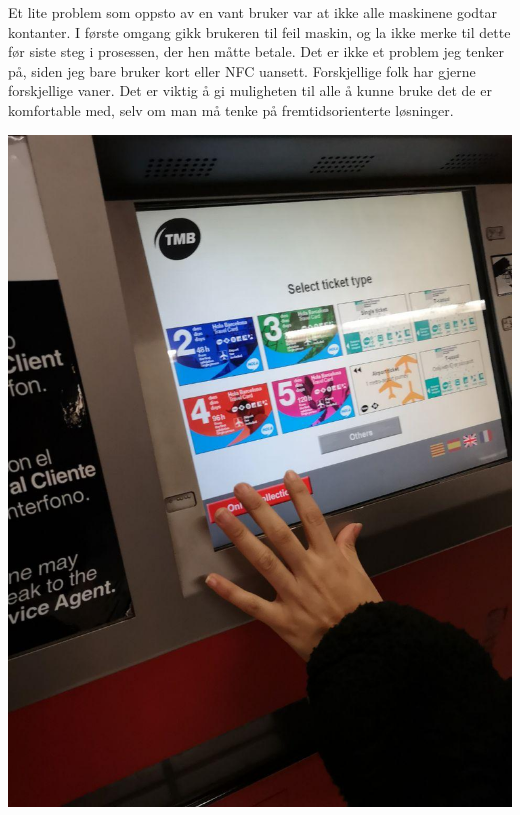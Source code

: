\documentclass{../../myassignment}
\begin{document}
	Et lite problem som oppsto av en vant bruker var at ikke alle maskinene godtar kontanter. I f{\o}rste omgang gikk brukeren til feil maskin, og la ikke merke til dette f{\o}r siste steg i prosessen, der hen m{\aa}tte betale. Det er ikke et problem jeg tenker p{\aa}, siden jeg bare bruker kort eller NFC uansett. Forskjellige folk har gjerne forskjellige vaner. Det er viktig {\aa} gi muligheten til alle {\aa} kunne bruke det de er komfortable med, selv om man m{\aa} tenke p{\aa} fremtidsorienterte l{\o}sninger. 

	\includegraphics[scale=0.2]{pictures/tickettype.jpg}
\end{document}

